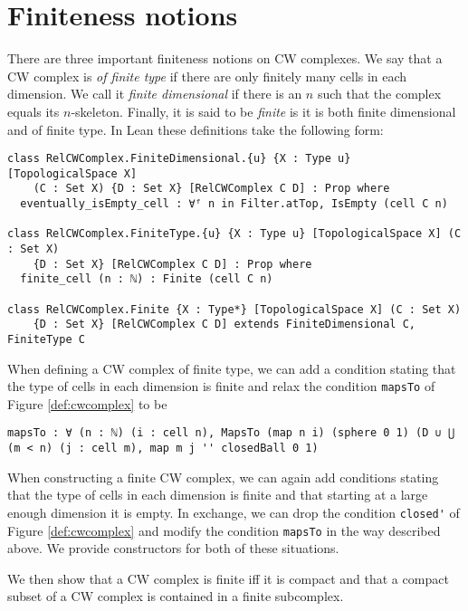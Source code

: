 \section{Finiteness notions}


There are three important finiteness notions on CW complexes. 
We say that a CW complex is \emph{of finite type} if there are only finitely many cells in each dimension. 
We call it \emph{finite dimensional} if there is an $n$ such that the complex equals its $n$-skeleton.
Finally, it is said to be \emph{finite} is it is both finite dimensional and of finite type. 
In Lean these definitions take the following form: 

\begin{lstlisting}[frame=single]
class RelCWComplex.FiniteDimensional.{u} {X : Type u} [TopologicalSpace X] 
    (C : Set X) {D : Set X} [RelCWComplex C D] : Prop where
  eventually_isEmpty_cell : ∀ᶠ n in Filter.atTop, IsEmpty (cell C n)

class RelCWComplex.FiniteType.{u} {X : Type u} [TopologicalSpace X] (C : Set X) 
    {D : Set X} [RelCWComplex C D] : Prop where
  finite_cell (n : ℕ) : Finite (cell C n)

class RelCWComplex.Finite {X : Type*} [TopologicalSpace X] (C : Set X) 
    {D : Set X} [RelCWComplex C D] extends FiniteDimensional C, FiniteType C
\end{lstlisting}

When defining a CW complex of finite type, we can add a condition stating that the type of cells in each dimension is finite and relax the condition \lstinline|mapsTo| of Figure \ref{def:cwcomplex} to be

\begin{lstlisting}[frame=single]
mapsTo : ∀ (n : ℕ) (i : cell n), MapsTo (map n i) (sphere 0 1) (D ∪ ⋃ (m < n) (j : cell m), map m j '' closedBall 0 1)
\end{lstlisting}

When constructing a finite CW complex, we can again add conditions stating that the type of cells in each dimension is finite and that starting at a large enough dimension it is empty.
In exchange, we can drop the condition \lstinline|closed'| of Figure \ref{def:cwcomplex} and modify the condition \lstinline|mapsTo| in the way described above. 
We provide constructors for both of these situations.

We then show that a CW complex is finite iff it is compact and that a compact subset of a CW complex is contained in a finite subcomplex.